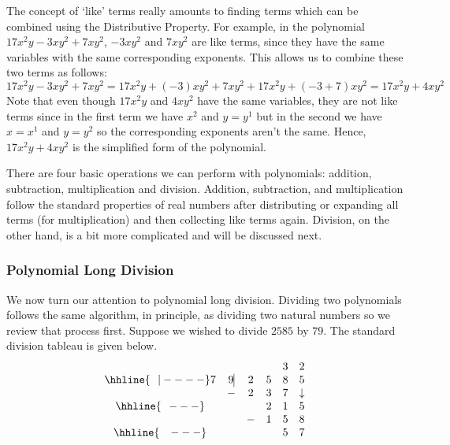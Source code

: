 \documentclass{ximera}
\begin{document}
The concept of `like' terms really amounts to finding terms which can be combined using the Distributive Property.  For example, in the polynomial $17x^2y - 3xy^2 + 7xy^2$, $-3xy^2$ and $7xy^2$ are like terms, since they have the same variables with the same corresponding exponents. This allows us to combine these two terms as follows:  
\[
    17x^2y -  3xy^2 + 7xy^2 = 17x^2y + (-3)xy^2 + 7xy^2 + 17x^2y +(-3 + 7)xy^2 = 17x^2y + 4xy^2
\]  
Note that even though $17x^2y$ and $4xy^2$ have the same variables, they are not like terms since in the first term we have $x^2$ and $y = y^1$ but in the second we have $x = x^1$ and $y = y^2$ so the corresponding exponents aren't the same.  Hence,  $17x^2y + 4xy^2$ is the simplified form of the polynomial.  

There are four basic operations we can perform with polynomials:  addition, subtraction, multiplication and division. Addition, subtraction, and multiplication follow the standard properties of real numbers after distributing or expanding all terms (for multiplication) and then collecting like terms again. Division, on the other hand, is a bit more complicated and will be discussed next.

\subsubsection{Polynomial Long Division}

We now turn our attention to polynomial long division.  Dividing two polynomials follows the same algorithm, in principle, as dividing two natural numbers so we review that process first.  Suppose we wished to divide $2585$ by $79$.  The standard division tableau is given below. 
\setlength\arraycolsep{0.1pt}
\setlength\extrarowheight{2pt}
\[ 
    \begin{array}{cccccc}
        &             &     &   & 3 & 2  \\ \hhline{~~|----}
      7 & 9  \vline & 2 & 5 & 8 & 5  \\
        &            -&   2 & 3 & 7 & \downarrow \\ \hhline{~~---} 
        &             &     & 2 & 1 &  5   \\ 
        &             &   - & 1 & 5 & 8    \\ \hhline{~~~---} 
        &             &     &   & 5 & 7    \\
    \end{array}
\]

\setlength\arraycolsep{5pt}
\setlength\extrarowheight{0pt}
\end{document}

